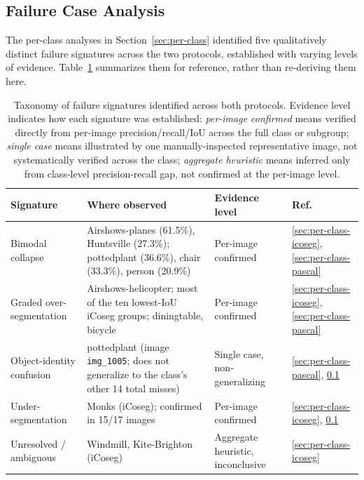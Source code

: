 \subsection{Failure Case Analysis}
\label{sec:failure-analysis}

The per-class analyses in Section~\ref{sec:per-class} identified five qualitatively distinct failure signatures across the two protocols, established with varying levels of evidence. Table~\ref{tab:failure-taxonomy} summarizes them for reference, rather than re-deriving them here.
\begin{table}[t]
\centering
\caption{Taxonomy of failure signatures identified across both protocols. Evidence level indicates how each signature was established: \emph{per-image confirmed} means verified directly from per-image precision/recall/IoU across the full class or subgroup; \emph{single case} means illustrated by one manually-inspected representative image, not systematically verified across the class; \emph{aggregate heuristic} means inferred only from class-level precision-recall gap, not confirmed at the per-image level.}
\label{tab:failure-taxonomy}
\begin{tabular}{p{2.1cm}p{2.3cm}p{1.5cm}p{1.2cm}}
\toprule
Signature & Where observed & Evidence level & Ref. \\
\midrule
Bimodal collapse & Airshows-planes (61.5\%), Huntsville (27.3\%); pottedplant (36.6\%), chair (33.3\%), person (20.9\%) & Per-image confirmed & \ref{sec:per-class-icoseg}, \ref{sec:per-class-pascal} \\
\addlinespace
Graded over-segmentation & Airshows-helicopter; most of the ten lowest-IoU iCoseg groups; diningtable, bicycle & Per-image confirmed & \ref{sec:per-class-icoseg}, \ref{sec:per-class-pascal} \\
\addlinespace
Object-identity confusion & pottedplant (image \texttt{img\_1005}; does not generalize to the class's other 14 total misses) & Single case, non-generalizing & \ref{sec:per-class-pascal}, \ref{sec:failure-analysis} \\
\addlinespace
Under-segmentation & Monks (iCoseg); confirmed in 15/17 images & Per-image confirmed & \ref{sec:per-class-icoseg}, \ref{sec:failure-analysis} \\
\addlinespace
Unresolved / ambiguous & Windmill, Kite-Brighton (iCoseg) & Aggregate heuristic, inconclusive & \ref{sec:per-class-icoseg} \\
\bottomrule
\end{tabular}
\end{table}

